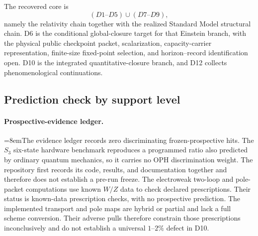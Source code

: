 \documentclass[11pt]{article}
\begin{document}
The recovered core is
\[
(D1\text{--}D5)\cup(D7\text{--}D9),
\]
namely the relativity chain together with the realized Standard Model structural chain. D6 is the
conditional global-closure target for that Einstein branch, with the physical public checkpoint packet,
scalarization, capacity-carrier representation, finite-size fixed-point selection, and horizon--record identification open. D10 is the integrated quantitative-closure branch, and D12 collects
phenomenological continuations.

\subsection{Prediction check by support level}

\paragraph{Prospective-evidence ledger.}
{\emergencystretch=8em\relax The evidence ledger records zero discriminating frozen-prospective hits. The \(S_3\)
six-state hardware benchmark reproduces a programmed ratio also predicted by ordinary quantum
mechanics, so it carries no OPH discrimination weight. The repository first records its code,
results, and documentation together and therefore does not establish a pre-run freeze. The
electroweak two-loop and
pole-packet computations use known \(W/Z\) data to check declared prescriptions. Their status is
known-data prescription checks, with no prospective prediction. The implemented transport and pole
maps are hybrid or partial and lack a full scheme conversion. Their adverse pulls therefore
constrain those prescriptions inconclusively and do not establish a universal \(1\)--\(2\%\) defect
in D10.\par}
\end{document}
